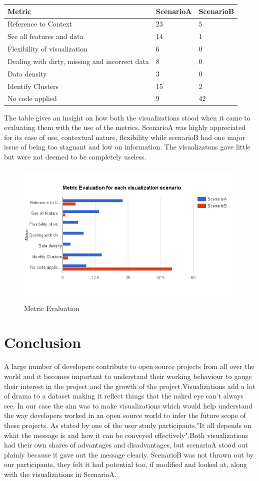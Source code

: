 \documentclass[double,12pt]{beavtex}
\begin{document}
\begin{tabular}{ |p{5cm}|p{3cm}|p{3cm}|  }
 \hline
Metric & ScenarioA & ScenarioB\\
 \hline
 Reference to Context & 23 & 5\\ \hline
 See all features and data & 14 & 1\\ \hline
 Flexibility of visualization & 6 & 0\\ \hline
 Dealing with dirty, missing and incorrect data & 8 & 0\\ \hline
 Data density & 3 & 0\\ \hline
 Identify Clusters & 15 & 2\\ \hline
 No code applied & 9 & 42\\ 
 \hline
\end{tabular}


The table gives an insight on how both the visualizations stood when it came to evaluating them with the use of the metrics. ScenarioA was highly appreciated for its ease of use, contextual nature, flexibility while scenarioB had one major issue of being too stagnant and low on information. The visualizatons gave little but were not deemed to be completely useless.

\begin{figure}[!ht]
\centering
\includegraphics[width=110mm,height=70mm]{metric.png}
\caption{Metric Evaluation}
\end{figure}

\chapter{Conclusion}
A large number of developers contribute to open source projects from all over the world and it becomes important to understand their working behaviour to gauge their interest in the project and the growth of the project.Visualizations add a lot of drama to a dataset making it reflect things that the naked eye can't always see. In our case the aim was to make visualizations which would help understand the way developers worked in an open source world to infer the future scope of these projects. As stated by one of the user study participants,"It all depends on what the message is and how it can be conveyed effectively".Both visualizations had their own shares of advantages and disadvantages, but scenarioA stood out plainly because it gave out the message clearly. ScenarioB was not thrown out by our participants, they felt it had potential too, if modified and looked at, along with the visualizations in ScenarioA. 




\end{document}
